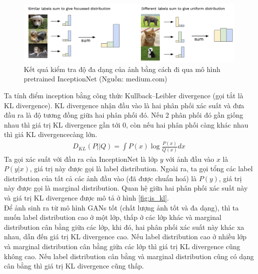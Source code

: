 {    \begin{figure}[H]
    \centering
    \includegraphics[width=13cm] {images/inception_3.png}
    \caption{Kết quả kiểm tra độ đa dạng của ảnh bằng cách đi qua mô hình pretrained InceptionNet (Nguồn: medium.com)}
    \label{fig:inception}
    \end{figure}
    \noindent Ta tính điểm inception bằng công thức Kullback–Leibler divergence (gọi tắt là KL divergence). KL divergence nhận đầu vào là hai phân phối xác suất và đưa đầu ra là độ tương đồng giữa hai phân phối đó. Nếu 2 phân phối đó gần giống nhau thì giá trị KL divergence gần tới 0, còn nếu hai phân phối càng khác nhau thì giá KL divergencecàng lớn.
    \begin{align}
        D_{KL}(P||Q) = \int P(x) \log \frac {P(x)}{Q(x)}dx
    \end{align}
    Ta gọi xác suất với đầu ra của InceptionNet là lớp $y$ với ảnh đầu vào $x$ là $P(y|x)$, giá trị này được gọi là label distribution. Ngoài ra, ta gọi tổng các label distribution của tất cả các ảnh đầu vào (đã được chuẩn hoá) là $P(y)$, giá trị này được gọi là marginal distribution. Quan hệ giữa hai phân phối xác suất này và giá trị KL divergence được mô tả ở hình \ref{fig:is_kl}.\\
    Để ảnh sinh ra từ mô hình GANs tốt (chất lượng ảnh tốt và đa dạng), thì ta muốn label distribution cao ở một lớp, thấp ở các lớp khác và marginal distribution cân bằng giữa các lớp, khi đó, hai phân phối xác suất này khác xa nhau, dẫn đến giá trị KL divergence cao. Nếu label distribution cao ở nhiều lớp và marginal distribution cân bằng giữa các lớp thì giá trị KL divergence cũng không cao. Nếu label distribution cân bằng và marginal distribution cũng có dạng cân bằng thì giá trị KL divergence cũng thấp.\\
}
